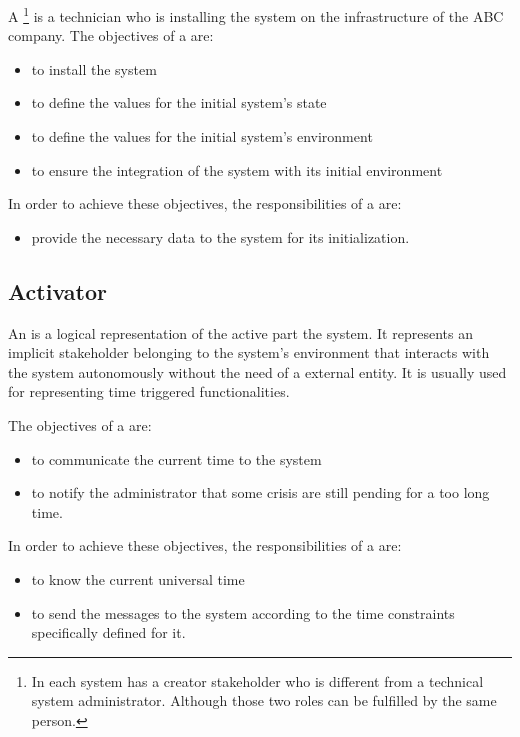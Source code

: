 A \footnote{In \msrmessir each system has a creator stakeholder who is different from a technical system administrator. Although those two roles can be fulfilled by the same person.} is a technician who is installing the \msricrash system on the infrastructure of the ABC company.
The objectives of a  are:
\begin{itemize}
  \item to install the \msricrash system
  \item to define the values for the initial system's state
  \item to define the values for the initial system's environment
  \item to ensure the integration of the \msricrash system with its initial environment
\end{itemize}
\vspace{0.5cm}
In order to achieve these objectives, the responsibilities of a  are:
\begin{itemize}
  \item provide the necessary data to the \msricrash system for its initialization.
\end{itemize}

\subsection{Activator}

An  is a logical representation of the active part the \msricrash system. It represents an implicit stakeholder belonging to the system's environment that interacts with the \msricrash system autonomously without the need of a external entity. It is usually used for representing time triggered functionalities.

The objectives of a  are:
\begin{itemize}
  \item to communicate the current time to the system
  \item to notify the administrator that some crisis are still pending for a too long time.
\end{itemize}
\vspace{0.5cm}
In order to achieve these objectives, the responsibilities of a  are:
\begin{itemize}
  \item to know the current universal time
  \item to send the messages to the system according to the time constraints specifically defined for it.
\end{itemize}


